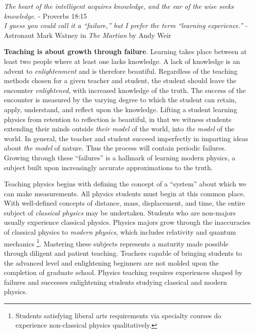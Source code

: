 \documentclass[../../main.tex]{subfiles}
\begin{document}
\epigraph{\textit{The heart of the intelligent acquires knowledge, and the ear of the wise seeks knowledge.} - Proverbs 18:15 \\ \vspace{0.1cm} \textit{I guess you could call it a ``failure,'' but I prefer the term ``learning experience.''} - Astronaut Mark Watney in \textit{The Martian} by Andy Weir}{}

\textbf{Teaching is about growth through failure}.  Learning takes place between at least two people where at least one lacks knowledge.  A lack of knowledge is an advent to \textit{enlightenment} and is therefore beautiful.  Regardless of the teaching methods chosen for a given teacher and student, the student should leave the encounter \textit{enlightened}, with increased knowledge of the truth.  The success of the encounter is measured by the varying degree to which the student can retain, apply, understand, and reflect upon the knowledge.  Lifting a student learning physics from retention to reflection is beautiful, in that we witness students extending their minds outside \textit{their model} of the world, into \textit{the model} of the world.  In general, the teacher and student succeed imperfectly in imparting ideas about \textit{the model} of nature.  Thus the process will contain periodic failures.  Growing through these ``failures'' is a hallmark of learning modern physics, a subject built upon increasingly accurate approximations to the truth. \\ \hspace{0.1cm}

Teaching physics begins with defining the concept of a ``system'' about which we can make measurements.  All physics students must begin at this common place.  With well-defined concepts of distance, mass, displacement, and time, the entire subject of \textit{classical physics} may be undertaken.  Students who are non-majors usually experience classical physics.  Physics majors grow through the inaccuracies of classical physics to \textit{modern physics}, which includes relativity and quantum mechanics \footnote{Students satisfying liberal arts requirements via specialty courses do experience non-classical physics qualitatively.}.  Mastering these subjects represents a maturity made possible through diligent and patient teaching.  Teachers capable of bringing students to the advanced level and enlightening beginners are not molded upon the completion of graduate school.  Physics teaching requires experiences shaped by failures and successes enlightening students studying classical and modern physics. \\ \hspace{0.1cm}
\end{document}
